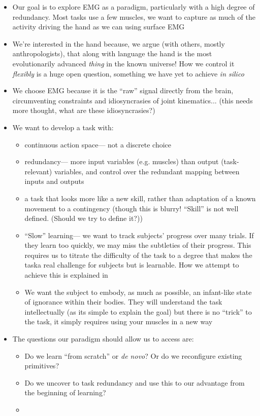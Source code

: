 \documentclass[../main.tex]{subfiles}
\begin{document}
\begin{itemize}
  \item Our goal is to explore EMG as a paradigm, particularly with a high degree of redundancy. Most tasks use a few muscles, we want to capture as much of the activity driving the hand as we can using surface EMG
  \item We're interested in the hand because, we argue (with others, mostly anthropologists), that along with language the hand is the most evolutionarily advanced \textit{thing} in the known universe! How we control it \textit{flexibly} is a huge open question, something we have yet to achieve \textit{in silico}
  \item We choose EMG because it is the ``raw'' signal directly from the brain, circumventing constraints and idiosyncrasies of joint kinematics... (this needs more thought, what are these idiosyncrasies?)
  \item We want to develop a task with:
  \begin{itemize}
    \item continuous action space--- not a discrete choice
    \item redundancy--- more input variables (e.g. muscles) than output (task-relevant) variables, and control over the redundant mapping between inputs and outputs
    \item a task that looks more like a new skill, rather than adaptation of a known movement to a contingency (though this is blurry! ``Skill'' is not well defined. (Should we try to define it?))
    \item ``Slow'' learning--- we want to track subjects' progress over many trials. If they learn too quickly, we may miss the subtleties of their progress. This requires us to titrate the difficulty of the task to a degree that makes the taska real challenge for subjects but is learnable. How we attempt to achieve this is explained in 
    \item We want the subject to embody, as much as possible, an infant-like state of ignorance within their bodies. They will understand the task intellectually (as its simple to explain the goal) but there is no ``trick'' to the task, it simply requires using your muscles in a new way
  \end{itemize}
  \item The questions our paradigm should allow us to access are:
  \begin{itemize}
    \item Do we learn ``from scratch'' or \textit{de novo}? Or do we reconfigure existing primitives?
    \item Do we uncover to task redundancy and use this to our advantage from the beginning of learning?
    \item 
  \end{itemize}
\end{itemize}
\end{document}
